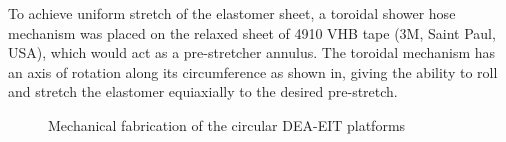 To achieve uniform stretch of the elastomer sheet, a toroidal shower hose mechanism was placed on the relaxed sheet of 4910 VHB tape (3M, Saint Paul, USA), which would act as a pre-stretcher annulus. The toroidal mechanism has an axis of rotation along its circumference as shown in, giving the ability to roll and stretch the elastomer equiaxially to the desired pre-stretch. 
\begin{figure}[H]
	\centering
	\hspace{0.5cm}
	\hspace{1cm}
	\hspace{1cm}
	\vspace{0.2cm}
	\caption{Mechanical fabrication of the circular DEA-EIT platforms}
	\label{fig:DEA_components}
\end{figure}


